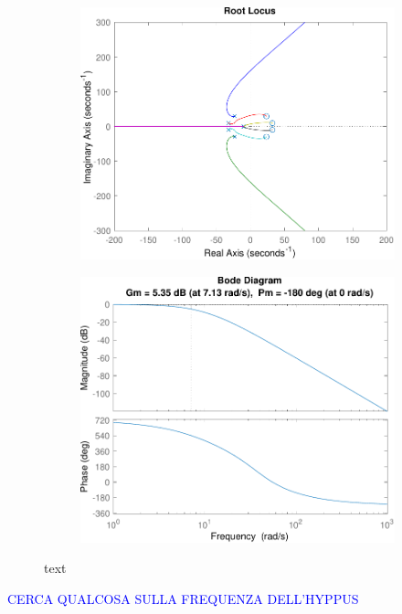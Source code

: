 \begin{figure}
	\begin{subfigure}{0.5\linewidth}
		\centering
		\includegraphics[width=0.9\linewidth]{../code/pupillary/sine/figs/rlocus}
		\caption{}
	\end{subfigure}\hfill
	\begin{subfigure}{0.5\linewidth}
		\centering
		\includegraphics[width=0.9\linewidth]{../code/pupillary/sine/figs/margin}
		\caption{}
	\end{subfigure}\hfill
	\caption{text}
\end{figure}



\textcolor{blue}{CERCA QUALCOSA SULLA FREQUENZA DELL'HYPPUS}

